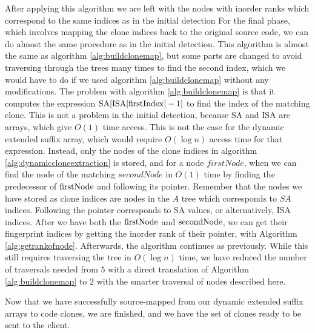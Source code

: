 After applying this algorithm we are left with the nodes with inorder ranks which
correspond to the same indices as in the initial detection For the final phase, which
involves mapping the clone indices back to the original source code, we can do almost the
same procedure as in the initial detection. This algorithm is almost the same as algorithm
\ref{alg:buildclonemap}, but some parts are changed to avoid traversing through the trees
many times to find the second index, which we would have to do if we used algorithm
\ref{alg:buildclonemap} without any modifications. The problem with algorithm
\ref{alg:buildclonemap} is that it computes the expression $\mathrm{SA}[{\mathrm{ISA}[{\mathrm{firstIndex}}] -
1}]$ to find the index of the matching clone. This is not a problem in the initial
detection, because SA and ISA are arrays, which give $O(1)$ time access. This is not the
case for the dynamic extended suffix array, which would require $O(\log n)$ access time
for that expression. Instead, only the nodes of the clone indices in algorithm
\ref{alg:dynamiccloneextraction} is stored, and for a node $firstNode$, when we can find
the node of the matching $secondNode$ in $O(1)$ time by finding the predecessor of
$\mathrm{firstNode}$ and following its pointer. Remember that the nodes we have stored as
clone indices are nodes in the $A$ tree which corresponds to $SA$ indices. Following the
pointer corresponds to SA values, or alternatively, ISA indices. After we have both the
$\mathrm{firstNode}$ and $\mathrm{secondNode}$, we can get their fingerprint indices by getting
the inorder rank of their pointer, with Algorithm \ref{alg:getrankofnode}. Afterwards, the
algorithm continues as previously. While this still requires traversing the tree in
$O(\log n)$ time, we have reduced the number of traversals needed from $5$ with a direct
translation of Algorithm \ref{alg:buildclonemap} to $2$ with the smarter traversal of
nodes described here.

Now that we have successfully source-mapped from our dynamic extended suffix arrays to
code clones, we are finished, and we have the set of clones ready to be sent to the
client.
